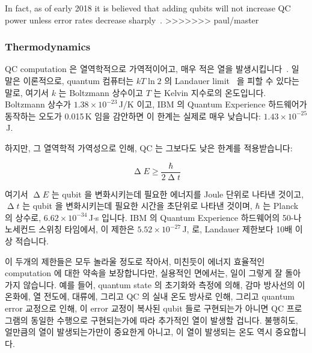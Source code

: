 In fact, as of early 2018 it is believed that adding qubits will not
increase QC power unless error rates decrease
sharply~\cite{IBMResearch2018QuantumVolume}.
>>>>>>> paul/master

\subsubsection{Thermodynamics}
\label{sec:future:Thermodynamics}

QC computation 은 열역학적으로 가역적이어고, 매우 적은 열을
발생시킵니다~\cite{Bennett:1973:LRC:1664562.1664568,RichardFeynman1986QuantumMechanicalComputers}.
일 말은 이론적으로, quantum 컴퓨터는 $kT \ln 2$ 의 Landauer
limit~\cite{Landauer:1961:IHG:1661184.1661186} 을 피할 수 있다는 말로, 여기서
$k$ 는 Boltzmann 상수이고 $T$ 는 Kelvin 지수로의 온도입니다.
Boltzmann 상수가 $1.38 \times 10^{-23}$\,J/K 이고, IBM 의 Quantum Experience
하드웨어가 동작하는 오도가 0.015\,K 임을 감안하면 이 한계는 실제로 매우
낮습니다: $1.43 \times 10^{-25}$\,J.

하지만, 그 열역학적 가역성으로 인해, QC 는 그보다도 낮은 한계를 적용받습니다:

\begin{equation}
	\upDelta E \geq \frac{\hbar}{2 \upDelta t}
\end{equation}

여기서 $\upDelta E$ 는 qubit 을 변화시키는데 필요한 에너지를 Joule 단위로
나타낸 것이고, $\upDelta t$ 는 qubit 을 변화시키는데 필요한 시간을 초단위로
나타낸
것이며, $\hbar$ 는 Planck 의 상수로, $6.62 \times 10^{-34}$\,J$\cdot$s 입니다.
IBM 의 Quantum Experience 하드웨어의 50-나노세컨드 스위칭 타임에서, 이 제한은
$5.52 \times 10^{-27}$\,J, 로, Landauer 제한보다 10배 이상 적습니다.

이 두개의 제한들은 모두 놀라울 정도로 작아서, 미친듯이 에너지 효율적인
computation 에 대한 약속을 보장합니다만, 실용적인 면에서는, 일이 그렇게 잘
돌아가지 않습니다.
예를 들어, quantum state 의 초기화와 측정에 의해, 감마 방사선의 이온화에, 열
전도에, 대류에, 그리고 QC 의 실내 온도 방사로 인해, 그리고 quantum error
교정으로 인해, 이 error 교정이 복사된 qubit 들로 구현되는가 아니면 QC
프로그램의 동일한 수행으로 구현되는가에 따라 추가적인 열이 발생할 겁니다.
불행히도, 얼만큼의 열이 발생되는가만이 중요한게 아니고, 이 열이 발생되는 온도
역시 중요합니다.
\iffalse

